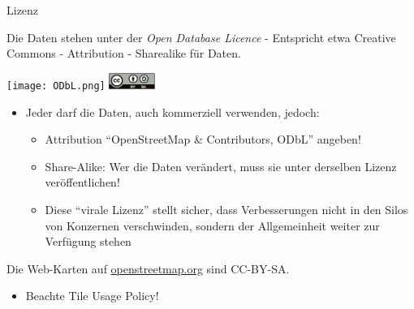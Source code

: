 \documentclass{beamer}
\begin{document}
\begin{frame}{Lizenz}

  Die Daten stehen unter der \emph{Open Database Licence} - Entspricht etwa Creative Commons - Attribution - Sharealike für Daten.

 \begin{center}
 \texttt{[image: ODbL.png]}
 \hspace{2cm}
 \includegraphics[width=1.5cm]{cc-by-sa.pdf}
 \end{center}

\pause

\vspace*{-0.3cm}

\begin{itemize}
  \item Jeder darf die Daten, auch kommerziell verwenden, jedoch:
  \begin{itemize}
    \item Attribution "`OpenStreetMap \& Contributors, ODbL"' angeben!
    \item Share-Alike: Wer die Daten verändert, muss sie unter derselben Lizenz veröffentlichen!
    \item Diese "`virale Lizenz"' stellt sicher, dass Verbesserungen nicht in den Silos von Konzernen verschwinden, sondern der Allgemeinheit weiter zur Verfügung stehen
  \end{itemize}

\end{itemize}


\pause
Die Web-Karten auf \href{http://osm.org}{openstreetmap.org} sind CC-BY-SA.
\begin{itemize}
  \item Beachte Tile Usage Policy!
\end{itemize}


\end{frame}

%
%
%
%
%
\end{document}
